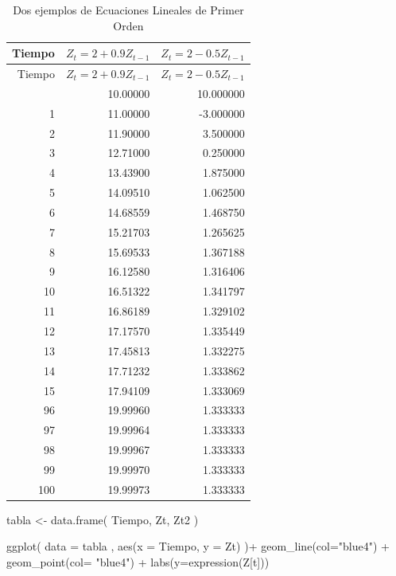 \documentclass[
  a4paper,
]{article}
\newenvironment{Shaded}{}{}
\newcommand{\AttributeTok}[1]{\textcolor[rgb]{0.84,0.23,0.29}{#1}}
\newcommand{\FunctionTok}[1]{\textcolor[rgb]{0.44,0.26,0.76}{#1}}
\newcommand{\NormalTok}[1]{\textcolor[rgb]{0.14,0.16,0.18}{#1}}
\newcommand{\OtherTok}[1]{\textcolor[rgb]{0.44,0.26,0.76}{#1}}
\newcommand{\SpecialCharTok}[1]{\textcolor[rgb]{0.00,0.36,0.77}{#1}}
\newcommand{\StringTok}[1]{\textcolor[rgb]{0.01,0.18,0.38}{#1}}
\begin{document}
\begin{longtable}[]{@{}rrr@{}}
\caption{Dos ejemplos de Ecuaciones Lineales de Primer
Orden}\tabularnewline
\toprule\noalign{}
Tiempo & \(Z_t =2+0.9Z_{t-1}\) & \(Z_t = 2-0.5Z_{t-1}\) \\
\midrule\noalign{}
\endfirsthead
\toprule\noalign{}
Tiempo & \(Z_t =2+0.9Z_{t-1}\) & \(Z_t = 2-0.5Z_{t-1}\) \\
\midrule\noalign{}
\endhead
\bottomrule\noalign{}
\endlastfoot
0 & 10.00000 & 10.000000 \\
1 & 11.00000 & -3.000000 \\
2 & 11.90000 & 3.500000 \\
3 & 12.71000 & 0.250000 \\
4 & 13.43900 & 1.875000 \\
5 & 14.09510 & 1.062500 \\
6 & 14.68559 & 1.468750 \\
7 & 15.21703 & 1.265625 \\
8 & 15.69533 & 1.367188 \\
9 & 16.12580 & 1.316406 \\
10 & 16.51322 & 1.341797 \\
11 & 16.86189 & 1.329102 \\
12 & 17.17570 & 1.335449 \\
13 & 17.45813 & 1.332275 \\
14 & 17.71232 & 1.333862 \\
15 & 17.94109 & 1.333069 \\
96 & 19.99960 & 1.333333 \\
97 & 19.99964 & 1.333333 \\
98 & 19.99967 & 1.333333 \\
99 & 19.99970 & 1.333333 \\
100 & 19.99973 & 1.333333 \\
\end{longtable}

\begin{Shaded}
\begin{Highlighting}[]
\NormalTok{tabla }\OtherTok{\textless{}{-}} \FunctionTok{data.frame}\NormalTok{( Tiempo, Zt, Zt2 )}

\FunctionTok{ggplot}\NormalTok{( }\AttributeTok{data =}\NormalTok{ tabla , }\FunctionTok{aes}\NormalTok{(}\AttributeTok{x =}\NormalTok{ Tiempo, }\AttributeTok{y =}\NormalTok{ Zt) )}\SpecialCharTok{+}
  \FunctionTok{geom\_line}\NormalTok{(}\AttributeTok{col=}\StringTok{"blue4"}\NormalTok{) }\SpecialCharTok{+}
  \FunctionTok{geom\_point}\NormalTok{(}\AttributeTok{col=} \StringTok{"blue4"}\NormalTok{) }\SpecialCharTok{+}
  \FunctionTok{labs}\NormalTok{(}\AttributeTok{y=}\FunctionTok{expression}\NormalTok{(Z[t]))}
\end{Highlighting}
\end{Shaded}
\end{document}
